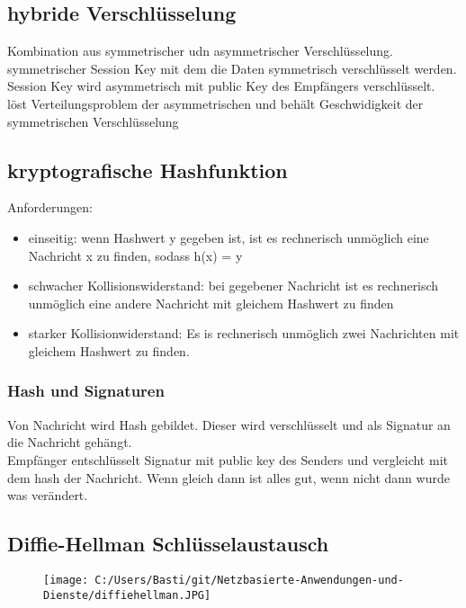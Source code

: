 \documentclass{article} %
\begin{document}
\subsection{hybride Verschlüsselung}
Kombination aus symmetrischer udn asymmetrischer Verschlüsselung.\\
symmetrischer Session Key mit dem die Daten symmetrisch verschlüsselt werden.\\
Session Key wird asymmetrisch mit public Key des Empfängers verschlüsselt.\\
löst Verteilungsproblem der asymmetrischen und behält Geschwidigkeit der symmetrischen Verschlüsselung\\
\subsection{kryptografische Hashfunktion}
Anforderungen:
\begin{itemize}
	\item einseitig: wenn Hashwert y gegeben ist, ist es rechnerisch unmöglich eine Nachricht x zu finden, sodass h(x) = y
    \item schwacher Kollisionswiderstand: bei gegebener Nachricht ist es rechnerisch unmöglich eine andere Nachricht mit gleichem Hashwert zu finden
    \item starker Kollisionwiderstand: Es is rechnerisch unmöglich zwei Nachrichten mit gleichem Hashwert zu finden.
\end{itemize}
\subsubsection{Hash und Signaturen}
Von Nachricht wird Hash gebildet. Dieser wird verschlüsselt und als Signatur an die Nachricht gehängt.\\
Empfänger entschlüsselt Signatur mit public key des Senders und vergleicht mit dem hash der Nachricht. Wenn gleich dann ist alles gut, wenn nicht dann wurde was verändert.\\
\subsection{Diffie-Hellman Schlüsselaustausch}
\begin{figure}[h]
	\centering
		\texttt{[image: C:/Users/Basti/git/Netzbasierte-Anwendungen-und-Dienste/diffiehellman.JPG]}
	\label{fig:diffiehellman}
\end{figure}
\end{document}

